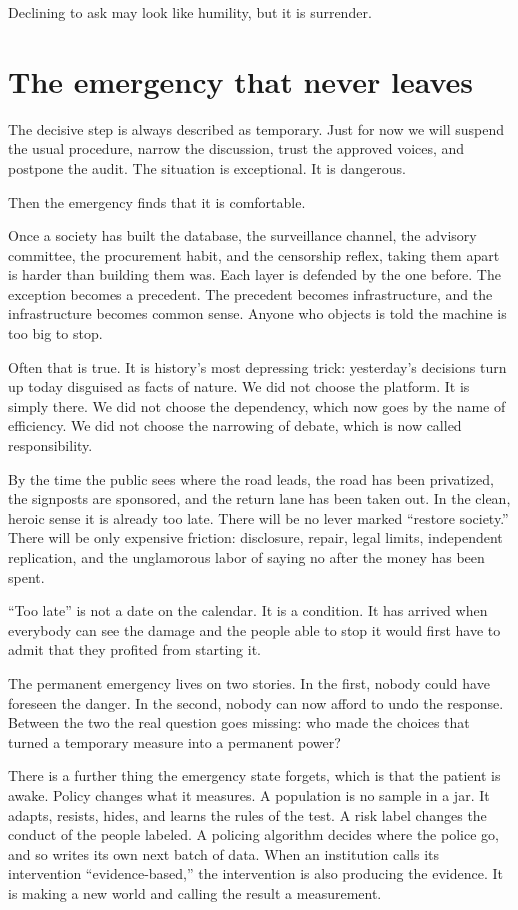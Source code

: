 \documentclass[12pt,a4paper]{book}
\begin{document}
Declining to ask may look like humility, but it is surrender.

\section{The emergency that never leaves}

The decisive step is always described as temporary. Just for now we will suspend the usual procedure, narrow the discussion, trust the approved voices, and postpone the audit. The situation is exceptional. It is dangerous.

Then the emergency finds that it is comfortable.

Once a society has built the database, the surveillance channel, the advisory committee, the procurement habit, and the censorship reflex, taking them apart is harder than building them was. Each layer is defended by the one before. The exception becomes a precedent. The precedent becomes infrastructure, and the infrastructure becomes common sense. Anyone who objects is told the machine is too big to stop.

Often that is true. It is history's most depressing trick: yesterday's decisions turn up today disguised as facts of nature. We did not choose the platform. It is simply there. We did not choose the dependency, which now goes by the name of efficiency. We did not choose the narrowing of debate, which is now called responsibility.

By the time the public sees where the road leads, the road has been privatized, the signposts are sponsored, and the return lane has been taken out. In the clean, heroic sense it is already too late. There will be no lever marked ``restore society.'' There will be only expensive friction: disclosure, repair, legal limits, independent replication, and the unglamorous labor of saying no after the money has been spent.

``Too late'' is not a date on the calendar. It is a condition. It has arrived when everybody can see the damage and the people able to stop it would first have to admit that they profited from starting it.

The permanent emergency lives on two stories. In the first, nobody could have foreseen the danger. In the second, nobody can now afford to undo the response. Between the two the real question goes missing: who made the choices that turned a temporary measure into a permanent power?

There is a further thing the emergency state forgets, which is that the patient is awake. Policy changes what it measures. A population is no sample in a jar. It adapts, resists, hides, and learns the rules of the test. A risk label changes the conduct of the people labeled. A policing algorithm decides where the police go, and so writes its own next batch of data. When an institution calls its intervention ``evidence-based,'' the intervention is also producing the evidence. It is making a new world and calling the result a measurement.
\end{document}
